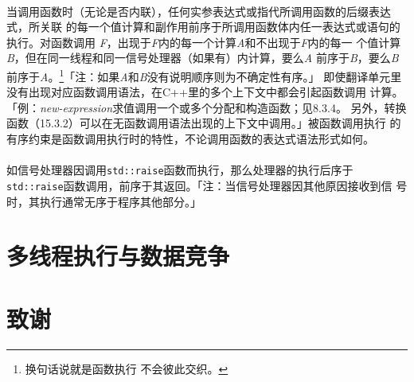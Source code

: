 \paragraph{}
当调用函数时（无论是否内联），任何实参表达式或指代所调用函数的后缀表达式，所关联
的每一个值计算和副作用前序于所调用函数体内任一表达式或语句的执行。对函数调用
\textit{F}，出现于\textit{F}内的每一个计算\textit{A}和不出现于\textit{F}内的每一
个值计算\textit{B}，但在同一线程和同一信号处理器（如果有）内计算，要么\textit{A}
前序于\textit{B}，要么\textit{B}前序于\textit{A}。\footnote{换句话说就是函数执行
不会彼此交织。}「注：如果\textit{A}和\textit{B}没有说明顺序则为不确定性有序。」
即使翻译单元里没有出现对应函数调用语法，在C++里的多个上下文中都会引起函数调用
计算。「例：\textit{new-expression}求值调用一个或多个分配和构造函数；见8.3.4。
另外，转换函数（15.3.2）可以在无函数调用语法出现的上下文中调用。」被函数调用执行
的有序约束是函数调用执行时的特性，不论调用函数的表达式语法形式如何。

\paragraph{}
如信号处理器因调用\texttt{std::raise}函数而执行，那么处理器的执行后序于
\texttt{std::raise}函数调用，前序于其返回。「注：当信号处理器因其他原因接收到信
号时，其执行通常无序于程序其他部分。」

\section{多线程执行与数据竞争}
\section{致谢}

